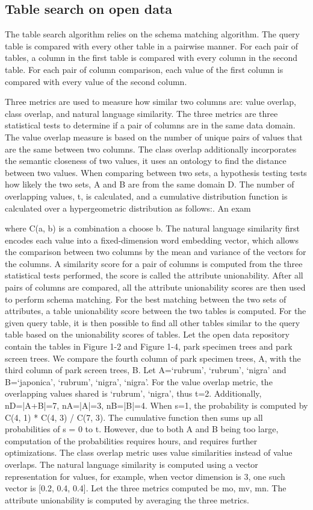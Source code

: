 \subsection{Table search on open data}
\label{ssec:TableSearchOnOpenData}

The table search algorithm relies on the schema matching algorithm. The query table is compared with every other table in a pairwise manner. For each pair of tables, a column in the first table is compared with every column in the second table. For each pair of column comparison, each value of the first column is compared with every value of the second column.

Three metrics are used to measure how similar two columns are: value overlap, class overlap, and natural language similarity. The three metrics are three statistical tests to determine if a pair of columns are in the same data domain. The value overlap measure is based on the number of unique pairs of values that are the same between two columns. The class overlap additionally incorporates the semantic closeness of two values, it uses an ontology to find the distance between two values. When comparing between two sets, a hypothesis testing tests how likely the two sets, A and B are from the same domain D. The number of overlapping values, t, is calculated, and a cumulative distribution function is calculated over a hypergeometric distribution as follows:. An exam

where C(a, b) is a combination a choose b. The natural language similarity first encodes each value into a fixed-dimension word embedding vector, which allows the comparison between two columns by the mean and variance of the vectors for the columns.
A similarity score for a pair of columns is computed from the three statistical tests performed, the score is called the attribute unionability. After all pairs of columns are compared, all the attribute unionability scores are then used to perform schema matching. For the best matching between the two sets of attributes, a table unionability score between the two tables is computed. For the given query table, it is then possible to find all other tables similar to the query table based on the unionability scores of tables.
Let the open data repository contain the tables in Figure 1-2 and Figure 1-4, park specimen trees and park screen trees. We compare the fourth column of park specimen trees, A, with the third column of park screen trees, B. Let A={`rubrum', `rubrum', `nigra'} and B={`japonica', `rubrum', `nigra', `nigra'}. For the value overlap metric, the overlapping values shared is {`rubrum', `nigra'}, thus t=2. Additionally, nD=|A+B|=7, nA=|A|=3, nB=|B|=4. When s=1, the probability is computed by C(4, 1) * C(4, 3) / C(7, 3). The cumulative function then sums up all probabilities of s = 0 to t. However, due to both A and B being too large, computation of the probabilities requires hours, and requires further optimizations. The class overlap metric uses value similarities instead of value overlaps. The natural language similarity is computed using a vector representation for values, for example, when vector dimension is 3, one such vector is [0.2, 0.4, 0.4]. Let the three metrics computed be {mo, mv, mn}. The attribute unionability is computed by averaging the three metrics.

